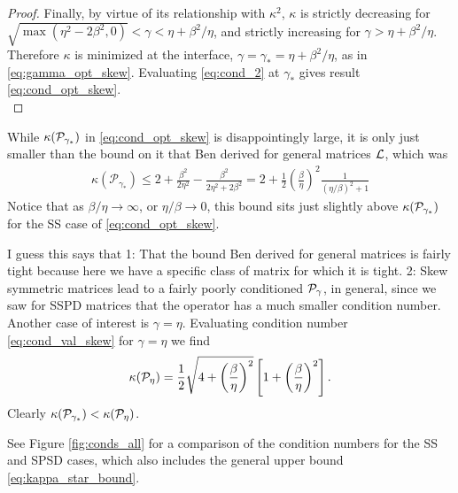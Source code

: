 \documentclass[a4paper,10pt]{article}
\begin{document}
{\begin{itemize}
\begin{proof}
Finally, by virtue of its relationship with $\kappa^2$, $\kappa$ is strictly decreasing for $\sqrt{\max(\eta^2 - 2 \beta^2, 0)} < \gamma < \eta + \beta^2/\eta$, and strictly increasing for $\gamma > \eta + \beta^2/\eta$. Therefore $\kappa$ is minimized at the interface, $\gamma = \gamma_* = \eta + \beta^2/\eta$, as in \eqref{eq:gamma_opt_skew}. Evaluating \eqref{eq:cond_2} at $\gamma_*$ gives result \eqref{eq:cond_opt_skew}.\\
\end{proof}

While $\kappa({\cal P}_{\gamma_*})$ in \eqref{eq:cond_opt_skew} is disappointingly large, it is only just smaller than the bound on it that Ben derived for general matrices ${\cal L}$, which was 
\begin{align} 
\label{eq:kappa_star_bound}
\kappa(\mathcal{P}_{\gamma_*}) \leq 2+\frac{\beta^2}{2\eta^2} - \frac{\beta^2}{2\eta^2+2\beta^2}
= 2 + \frac{1}{2} \left( \frac{\beta}{\eta} \right)^2 \frac{1}{(\eta/\beta)^2 + 1}
\end{align}
Notice that as $\beta/\eta \to \infty$, or $\eta/\beta \to 0$, this bound sits just slightly above $\kappa({\cal P}_{\gamma_*})$ for the SS case of \eqref{eq:cond_opt_skew}.

I guess this says that 1: That the bound Ben derived for general matrices is fairly tight because here we have a specific class of matrix for which it is tight. 2: Skew symmetric matrices lead to a fairly poorly conditioned ${\cal P}_{\gamma}$, in general, since we saw for SSPD matrices that the operator has a much smaller condition number.\\

Another case of interest is $\gamma = \eta$. Evaluating condition number \eqref{eq:cond_val_skew} for $\gamma = \eta$ we find
\begin{align}
\label{eq:kappa_eta_skew}
\kappa({\cal P}_{\eta}) = \frac{1}{2} \sqrt{4 + \left( \frac{\beta}{\eta} \right)^2} \left[ 1 + \left( \frac{\beta}{\eta} \right)^2 \right].
\end{align}
Clearly $\kappa({\cal P}_{\gamma_*}) < \kappa({\cal P}_{\eta})$. 

See Figure \ref{fig:conds_all} for a comparison of the condition numbers for the SS and SPSD cases, which also includes the general upper bound \eqref{eq:kappa_star_bound}.


\end{itemize}}
\end{document}
